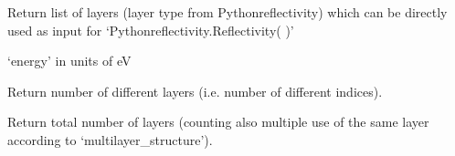 \documentclass[letterpaper,10pt,english]{sphinxmanual}
\begin{document}
\begin{fulllineitems}
\begin{fulllineitems}
\end{fulllineitems}


\begin{fulllineitems}
\label{\detokenize{modules-api/samplerepresentation:SampleRepresentation.Heterostructure.getSingleEnergyStructure}}
Return list of layers (layer type from Pythonreflectivity) which can be directly used as input for ‘Pythonreflectivity.Reflectivity( )’

‘energy’ in units of eV

\end{fulllineitems}


\begin{fulllineitems}
\label{\detokenize{modules-api/samplerepresentation:SampleRepresentation.Heterostructure.N}}
Return number of different layers (i.e. number of different indices).

\end{fulllineitems}


\begin{fulllineitems}
\label{\detokenize{modules-api/samplerepresentation:SampleRepresentation.Heterostructure.N_total}}
Return total number of layers (counting also multiple use of the same layer according to ‘multilayer\_structure’).

\end{fulllineitems}


\end{fulllineitems}

\end{document}

